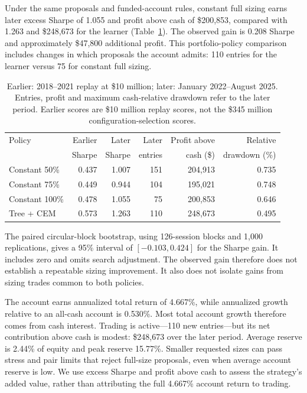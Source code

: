\documentclass[11pt,letterpaper]{article}
\newcommand{\money}[1]{\$#1}
\begin{document}
Under the same proposals and funded-account rules, constant full sizing earns
later excess Sharpe of 1.055 and profit above cash of \money{200,853}, compared
with 1.263 and \money{248,673} for the learner (Table~\ref{tab:main}). The
observed gain is 0.208 Sharpe and approximately \money{47,800} additional
profit. This portfolio-policy comparison includes changes in which proposals
the account admits: 110 entries for the learner versus 75 for constant full sizing.
\begin{table}[htbp]
\centering\small
\begin{tabular}{lrrrrr}
\toprule
Policy & Earlier & Later & Later & Profit above & Relative\\
 & Sharpe & Sharpe & entries & cash (\$) & drawdown (\%)\\
\midrule
Constant 50\% & 0.437 & 1.007 & 151 & 204,913 & 0.735\\
Constant 75\% & 0.449 & 0.944 & 104 & 195,021 & 0.748\\
Constant 100\% & 0.478 & 1.055 & 75 & 200,853 & 0.646\\
Tree + CEM & 0.573 & 1.263 & 110 & 248,673 & 0.495\\
\bottomrule
\end{tabular}
\caption{Earlier: 2018--2021 replay at \money{10 million}; later:
January 2022--August 2025. Entries, profit and maximum cash-relative drawdown
refer to the later period. Earlier scores are \money{10 million} replay
scores, not the \money{345 million} configuration-selection scores.}
\label{tab:main}
\end{table}

The paired circular-block bootstrap, using 126-session blocks and
1,000 replications, gives a 95\% interval of $[-0.103,0.424]$ for the Sharpe gain.
It includes zero and omits search adjustment. The observed gain therefore does
not establish a repeatable sizing improvement. It also does not isolate gains
from sizing trades common to both policies.

The account earns annualized total return of 4.667\%, while annualized growth
relative to an all-cash account is 0.530\%. Most total account growth therefore
comes from cash interest. Trading is active---110 new entries---but its net
contribution above cash is modest: \money{248,673} over the later period.
Average reserve is 2.44\% of equity and peak reserve 15.77\%. Smaller requested
sizes can pass stress and pair limits that reject full-size proposals, even
when average account reserve is low. We use excess
Sharpe and profit above cash to assess the strategy's added value, rather than
attributing the full 4.667\% account return to trading.
\end{document}
